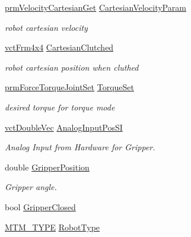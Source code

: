 \begin{DoxyCompactItemize}
\begin{tabbing}
\end{tabbing}\item 
\hyperlink{classprm_velocity_cartesian_get}{prm\+Velocity\+Cartesian\+Get} \hyperlink{classmts_intuitive_research_kit_m_t_m_ae7ad4869938caaec87e83ea60671ceab}{Cartesian\+Velocity\+Param}
\begin{DoxyCompactList}\small\item\em robot cartesian velocity \end{DoxyCompactList}\item 
\hyperlink{vct_transformation_types_8h_a33da47f4deb2556b37a69a2c44b29d75}{vct\+Frm4x4} \hyperlink{classmts_intuitive_research_kit_m_t_m_ad598efcb1d63152196891659bce6b4bf}{Cartesian\+Clutched}
\begin{DoxyCompactList}\small\item\em robot cartesian position when cluthed \end{DoxyCompactList}\item 
\hyperlink{classprm_force_torque_joint_set}{prm\+Force\+Torque\+Joint\+Set} \hyperlink{classmts_intuitive_research_kit_m_t_m_a78cce153418a304d9be36458e2252c4f}{Torque\+Set}
\begin{DoxyCompactList}\small\item\em desired torque for torque mode \end{DoxyCompactList}\item 
\hyperlink{vct_dynamic_vector_types_8h_ade4b3068c86fb88f41af2e5187e491c2}{vct\+Double\+Vec} \hyperlink{classmts_intuitive_research_kit_m_t_m_ae18a768f2aad718e26109dd1856489fd}{Analog\+Input\+Pos\+S\+I}
\begin{DoxyCompactList}\small\item\em Analog Input from Hardware for Gripper. \end{DoxyCompactList}\item 
double \hyperlink{classmts_intuitive_research_kit_m_t_m_a5daa7ff2d7390d64d1246c39609fbff2}{Gripper\+Position}
\begin{DoxyCompactList}\small\item\em Gripper angle. \end{DoxyCompactList}\item 
bool \hyperlink{classmts_intuitive_research_kit_m_t_m_a01d3a4aee8e09094de4b74e0b0b7be5a}{Gripper\+Closed}
\item 
\hyperlink{classmts_intuitive_research_kit_m_t_m_a2122075f3ef6c751e5bf65b690bf5b69}{M\+T\+M\+\_\+\+T\+Y\+P\+E} \hyperlink{classmts_intuitive_research_kit_m_t_m_a622deaf143e19a4e0ae3009cc56a1ee1}{Robot\+Type}

\end{DoxyCompactItemize}
